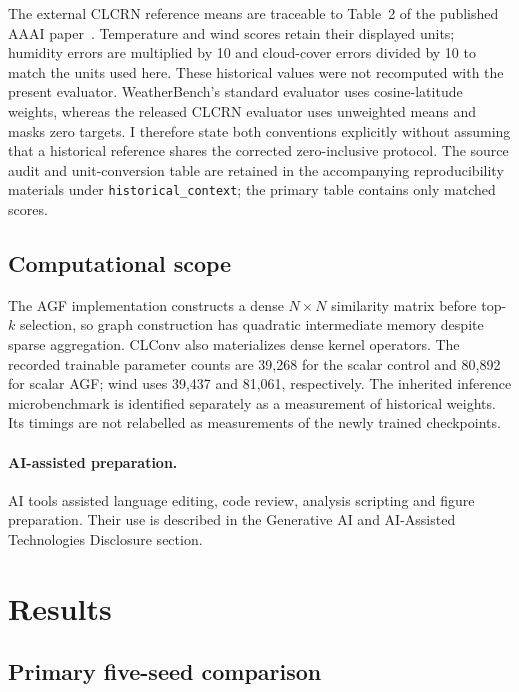 \documentclass[fleqn,10pt]{wlscirep}
\begin{document}
The external CLCRN reference means are traceable to Table~2 of the published
AAAI paper~\cite{lin2022conditional}. Temperature and wind scores retain
their displayed units; humidity errors are multiplied by 10 and cloud-cover
errors divided by 10 to match the units used here. These historical values were not
recomputed with the present evaluator. WeatherBench's standard evaluator
uses cosine-latitude weights, whereas the released CLCRN evaluator uses
unweighted means and masks zero targets. I therefore state both conventions
explicitly without assuming that a historical reference shares the corrected
zero-inclusive protocol. The source audit and unit-conversion table are
retained in the accompanying reproducibility materials under \texttt{historical\_context}; the primary table contains only matched scores.


\subsection{Computational scope}\label{sec:cost}
The AGF implementation constructs a dense $N\times N$ similarity matrix before top-$k$ selection, so graph construction has quadratic intermediate memory despite sparse aggregation. CLConv also materializes dense kernel operators. The recorded trainable parameter counts are 39,268 for the scalar control and 80,892 for scalar AGF; wind uses 39,437 and 81,061, respectively. The inherited inference microbenchmark is identified separately as a measurement of historical weights. Its timings are not relabelled as measurements of the newly trained checkpoints.


\paragraph{AI-assisted preparation.}
AI tools assisted language editing, code review, analysis scripting and figure
preparation. Their use is described in the Generative AI and AI-Assisted
Technologies Disclosure section.

\FloatBarrier
\section{Results}\label{sec:results}

\subsection{Primary five-seed comparison}\label{sec:primary}
\end{document}
